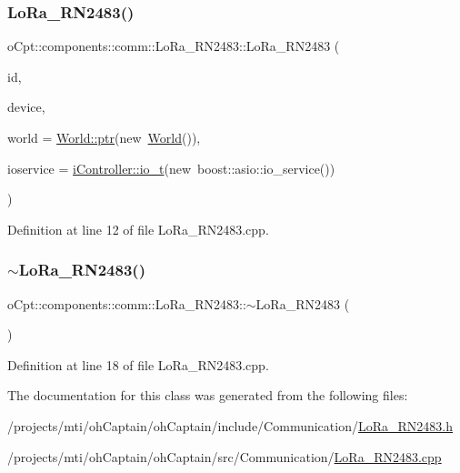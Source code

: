 \subsubsection{\texorpdfstring{Lo\+Ra\+\_\+\+R\+N2483()}{LoRa\_RN2483()}}
{\footnotesize\ttfamily o\+Cpt\+::components\+::comm\+::\+Lo\+Ra\+\_\+\+R\+N2483\+::\+Lo\+Ra\+\_\+\+R\+N2483 (\begin{DoxyParamCaption}\item[{const std\+::string \&}]{id,  }\item[{const std\+::string \&}]{device,  }\item[{\hyperlink{classo_cpt_1_1_world_aa6e591e3096d5de71e0cec9039663d67}{World\+::ptr}}]{world = {\ttfamily \hyperlink{classo_cpt_1_1_world_aa6e591e3096d5de71e0cec9039663d67}{World\+::ptr}(new~\hyperlink{classo_cpt_1_1_world}{World}())},  }\item[{\hyperlink{classo_cpt_1_1i_controller_a51c3436b03060209f6cd2ddce6df2d0c}{i\+Controller\+::io\+\_\+t}}]{ioservice = {\ttfamily \hyperlink{classo_cpt_1_1i_controller_a51c3436b03060209f6cd2ddce6df2d0c}{i\+Controller\+::io\+\_\+t}(new~boost\+:\+:asio\+:\+:io\+\_\+service())} }\end{DoxyParamCaption})}



Definition at line 12 of file Lo\+Ra\+\_\+\+R\+N2483.\+cpp.

\hypertarget{classo_cpt_1_1components_1_1comm_1_1_lo_ra___r_n2483_a30d55c900718ac38d0207c6f678ca96c}{}\label{classo_cpt_1_1components_1_1comm_1_1_lo_ra___r_n2483_a30d55c900718ac38d0207c6f678ca96c} 
\subsubsection{\texorpdfstring{$\sim$\+Lo\+Ra\+\_\+\+R\+N2483()}{~LoRa\_RN2483()}}
{\footnotesize\ttfamily o\+Cpt\+::components\+::comm\+::\+Lo\+Ra\+\_\+\+R\+N2483\+::$\sim$\+Lo\+Ra\+\_\+\+R\+N2483 (\begin{DoxyParamCaption}{ }\end{DoxyParamCaption})\hspace{0.3cm}{\ttfamily [virtual]}}



Definition at line 18 of file Lo\+Ra\+\_\+\+R\+N2483.\+cpp.



The documentation for this class was generated from the following files\+:\begin{DoxyCompactItemize}
\item 
/projects/mti/oh\+Captain/oh\+Captain/include/\+Communication/\hyperlink{_lo_ra___r_n2483_8h}{Lo\+Ra\+\_\+\+R\+N2483.\+h}\item 
/projects/mti/oh\+Captain/oh\+Captain/src/\+Communication/\hyperlink{_lo_ra___r_n2483_8cpp}{Lo\+Ra\+\_\+\+R\+N2483.\+cpp}\end{DoxyCompactItemize}
